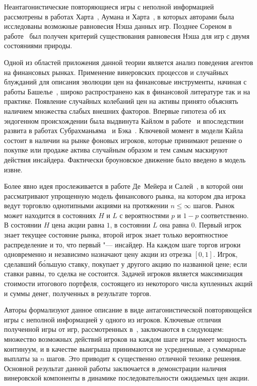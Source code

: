 Неантагонистические повторяющиеся игры с неполной информацией рассмотрены в работах Харта~\cite{hart85}, Аумана и Харта~\cite{aumann86}, в которых авторами была исследованы возможные равновесия Нэша данных игр.
Позднее Сореном в работе~\cite{sorin83} был получен критерий существования равновесия Нэша для игр с двумя состояниями природы.

Одной из областей приложения данной теории является анализ поведения агентов на финансовых рынках.
Применение винеровских процессов и случайных блужданий для описания эволюции цен на финансовые инструменты, начиная с работы Башелье~\cite{bachelier1900}, широко распространено как в финансовой литературе так и на практике.
Появление случайных колебаний цен на активы принято объяснять наличием множества слабых внешних факторов.
Впервые гипотеза об их эндогенном происхождении была выдвинута Кайлом в работе~\cite{kyle85} и впоследствии развита в работах Субрахманьяма~\cite{subrahmanyam91} и Бэка~\cite{back95}.
Ключевой момент в модели Кайла состоит в наличии на рынке фоновых игроков, которые принимают решение о покупке или продаже актива случайным образом и тем самым маскируют действия инсайдера.
Фактически броуновское движение было введено в модель извне.

Более явно идея прослеживается в работе Де~Мейера и Салей~\cite{demeyer02}, в которой они рассматривают упрощенную модель финансового рынка, на котором два
игрока ведут торговлю однотипными акциями на протяжении $n \leq \infty$ шагов.
Рынок может находится в состояниях $H$ и $L$ с вероятностями $p$ и $1-p$ соответственно.
В состоянии $H$ цена акции равна $1$, в состоянии $L$ она равна $0$.
Первый игрок знает текущее состояние рынка, второй игрок знает только вероятностное распределение и то, что первый "--- инсайдер.
На каждом шаге торгов игроки одновременно и независимо назначают цену акции из отрезка $[0,1]$.
Игрок, сделавший б\'{о}льшую ставку, покупает у другого акцию по названной цене; если ставки равны, то сделка не состоится.
Задачей игроков является максимизация стоимости итогового портфеля, состоящего из некоторого числа купленных акций и суммы денег, полученных в результате торгов.

Авторы формализуют данное описание в виде антагонистической повторяющейся игры с неполной информацией у одного из игроков.
Ключевые отличия полученной игры от игр, рассмотренных в~\cite{aumann95}, заключаются в следующем: множество возможных действий игроков на каждом шаге игры имеет мощность континуум, и в качестве выигрыша принимаются не усредненные, а суммарные выплаты за $n$ шагов.
Это приводит к существенно отличной технике решения. Основной результат данной работы заключается в демонстрации наличия винеровской компоненты в динамике последовательности ожидаемых цен акции.

